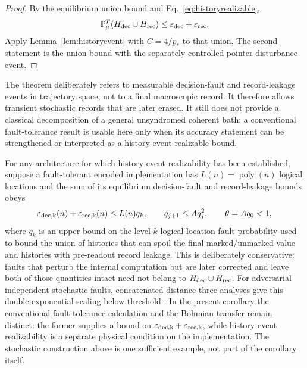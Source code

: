 \documentclass[pdflatex,sn-mathphys-num]{sn-jnl}
\theoremstyle{thmstyleone}
\begin{document}
\begin{proof}
By the equilibrium union bound and Eq.~\eqref{eq:historyrealizable},
\begin{equation}
\mathbb P_\mu^T(H_{\rm dec}\cup H_{\rm rec})
\le\varepsilon_{\rm dec}+\varepsilon_{\rm rec}.
\end{equation}
Apply Lemma~\ref{lem:historyevent} with $C=4/p_*$ to that union. The second statement is the union bound with the separately controlled pointer-disturbance event.
\end{proof}

The theorem deliberately refers to measurable decision-fault and record-leakage events in trajectory space, not to a final macroscopic record. It therefore allows transient stochastic records that are later erased. It still does not provide a classical decomposition of a general unsyndromed coherent bath: a conventional fault-tolerance result is usable here only when its accuracy statement can be strengthened or interpreted as a history-event-realizable bound.

For any architecture for which history-event realizability has been established, suppose a fault-tolerant encoded implementation has $L(n)=\operatorname{poly}(n)$ logical locations and the sum of its equilibrium decision-fault and record-leakage bounds obeys
\begin{equation}
\varepsilon_{\rm dec,k}(n)+\varepsilon_{\rm rec,k}(n)\le L(n)q_k,
\qquad
q_{j+1}\le A q_j^2,
\qquad
\theta=Aq_0<1,
\label{eq:FTinput}
\end{equation}
where $q_k$ is an upper bound on the level-$k$ logical-location fault probability used to bound the union of histories that can spoil the final marked/unmarked value and histories with pre-readout record leakage. This is deliberately conservative: faults that perturb the internal computation but are later corrected and leave both of those quantities intact need not belong to $H_{\rm dec}\cup H_{\rm rec}$. For adversarial independent stochastic faults, concatenated distance-three analyses give this double-exponential scaling below threshold \cite{AliferisGottesmanPreskill2006}. In the present corollary the conventional fault-tolerance calculation and the Bohmian transfer remain distinct: the former supplies a bound on $\varepsilon_{\rm dec,k}+\varepsilon_{\rm rec,k}$, while history-event realizability is a separate physical condition on the implementation. The stochastic construction above is one sufficient example, not part of the corollary itself.
\end{document}
